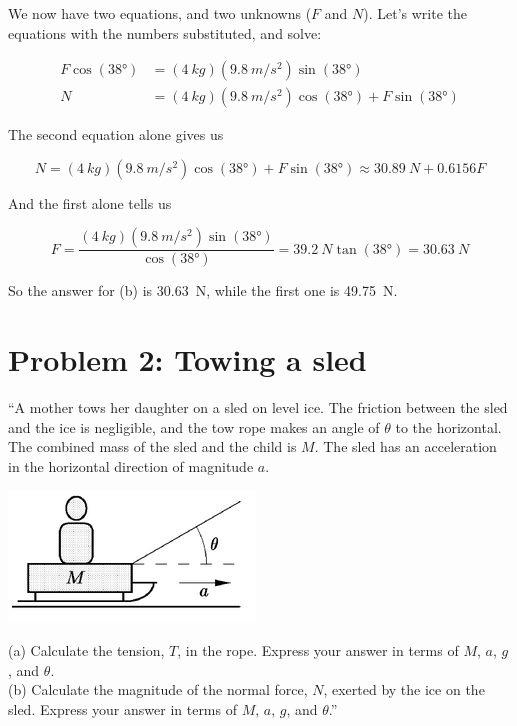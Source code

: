 \documentclass[12pt,a4paper]{report}
\begin{document}
We now have two equations, and two unknowns ($F$ and $N$). Let's write the equations with the numbers substituted, and solve:

\begin{align}
F \cos(\ang{38}) &= (\SI{4}{kg})(\SI{9.8}{m/s^2}) \sin(\ang{38})\\
N &= (\SI{4}{kg})(\SI{9.8}{m/s^2}) \cos(\ang{38}) + F \sin(\ang{38})
\end{align}

The second equation alone gives us

\begin{equation}
N = (\SI{4}{kg})(\SI{9.8}{m/s^2}) \cos(\ang{38}) + F \sin(\ang{38}) \approx \SI{30.89}{N} + 0.6156 F
\end{equation}

And the first alone tells us

\begin{equation}
F = \frac{(\SI{4}{kg})(\SI{9.8}{m/s^2}) \sin(\ang{38})}{\cos(\ang{38})} = \SI{39.2}{N} \tan(\ang{38}) = \SI{30.63}{N}
\end{equation}

So the answer for (b) is \SI{30.63}{N}, while the first one is \SI{49.75}{N}.

\section{Problem 2: Towing a sled}

``A mother tows her daughter on a sled on level ice. The friction between the sled and the ice is negligible, and the tow rope makes an angle of $\theta$ to the horizontal. The combined mass of the sled and the child is $M$. The sled has an acceleration in the horizontal direction of magnitude $a$.

\begin{center}
\includegraphics[scale=0.65]{Graphics/h3p2}
\end{center}

(a) Calculate the tension, $T$, in the rope. Express your answer in terms of $M$, $a$, $g$, and $\theta$.\\
(b) Calculate the magnitude of the normal force, $N$, exerted by the ice on the sled. Express your answer in terms of $M$, $a$, $g$, and $\theta$.''
\end{document}
